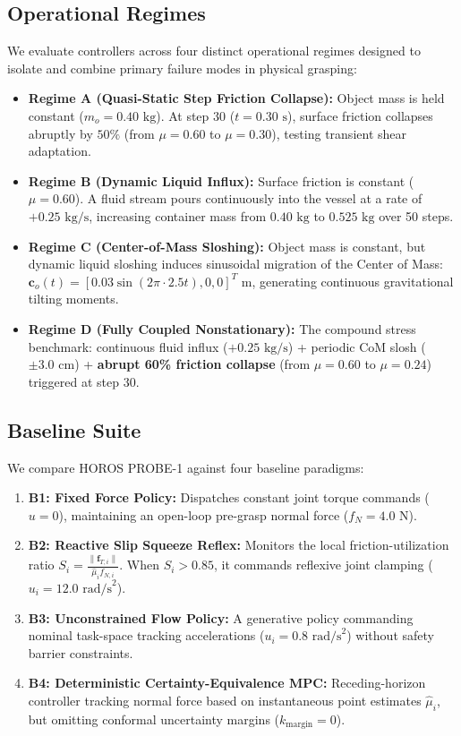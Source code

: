 \subsection{Operational Regimes}
We evaluate controllers across four distinct operational regimes designed to isolate and combine primary failure modes in physical grasping:
\begin{itemize}
    \item \textbf{Regime A (Quasi-Static Step Friction Collapse):} Object mass is held constant ($m_o = 0.40\text{ kg}$). At step $30$ ($t = 0.30\text{ s}$), surface friction collapses abruptly by $50\%$ (from $\mu = 0.60$ to $\mu = 0.30$), testing transient shear adaptation.
    \item \textbf{Regime B (Dynamic Liquid Influx):} Surface friction is constant ($\mu = 0.60$). A fluid stream pours continuously into the vessel at a rate of $+0.25\text{ kg/s}$, increasing container mass from $0.40\text{ kg}$ to $0.525\text{ kg}$ over 50 steps.
    \item \textbf{Regime C (Center-of-Mass Sloshing):} Object mass is constant, but dynamic liquid sloshing induces sinusoidal migration of the Center of Mass: $\mathbf{c}_o(t) = [0.03 \sin(2\pi \cdot 2.5 t), 0, 0]^T\text{ m}$, generating continuous gravitational tilting moments.
    \item \textbf{Regime D (Fully Coupled Nonstationary):} The compound stress benchmark: continuous fluid influx ($+0.25\text{ kg/s}$) + periodic CoM slosh ($\pm 3.0\text{ cm}$) + \textbf{abrupt 60\% friction collapse} (from $\mu = 0.60$ to $\mu = 0.24$) triggered at step $30$.
\end{itemize}

\subsection{Baseline Suite}
We compare HOROS PROBE-1 against four baseline paradigms:
\begin{enumerate}
    \item \textbf{B1: Fixed Force Policy:} Dispatches constant joint torque commands ($u = 0$), maintaining an open-loop pre-grasp normal force ($f_N = 4.0\text{ N}$).
    \item \textbf{B2: Reactive Slip Squeeze Reflex:} Monitors the local friction-utilization ratio $S_i = \frac{\|\mathbf{f}_{T, i}\|}{\hat{\mu}_i f_{N, i}}$. When $S_i > 0.85$, it commands reflexive joint clamping ($u_i = 12.0\text{ rad/s}^2$).
    \item \textbf{B3: Unconstrained Flow Policy:} A generative policy commanding nominal task-space tracking accelerations ($u_i = 0.8\text{ rad/s}^2$) without safety barrier constraints.
    \item \textbf{B4: Deterministic Certainty-Equivalence MPC:} Receding-horizon controller tracking normal force based on instantaneous point estimates $\hat{\mu}_i$, but omitting conformal uncertainty margins ($k_{\text{margin}} = 0$).
\end{enumerate}


